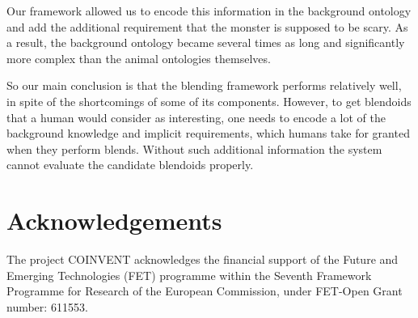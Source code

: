 \documentclass{ecai2012}
\begin{document}
Our framework allowed us to encode this information in the background ontology and add the additional requirement that the monster is
supposed to be scary. As a result, the background ontology became several times  as long and significantly more complex  than the animal
ontologies themselves. 

So our main conclusion is  that the blending framework performs relatively well,
in spite of the shortcomings of some of its components. However, to get blendoids
that a human would consider as interesting, one needs to  encode a lot of the
background knowledge and implicit requirements, which humans take for granted when
they perform blends. Without such additional information the system cannot 
evaluate the candidate blendoids properly. 









\section*{Acknowledgements}

%
The project COINVENT acknowledges the financial support of the Future and Emerging Technologies (FET) programme within the Seventh Framework Programme for Research of the European Commission, under FET-Open Grant number: 611553.


%
 

\end{document}
